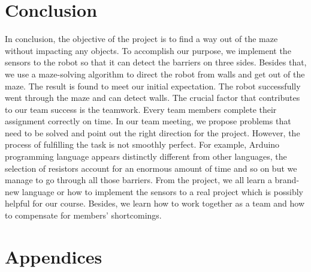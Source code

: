 \documentclass{article}
\begin{document}
\newpage
\section{Conclusion}
In conclusion, the objective of the project is to find a way out of the maze without impacting any objects. To accomplish our purpose, we implement the sensors to the robot so that it can detect the barriers on three sides. Besides that, we use a maze-solving algorithm to direct the robot from walls and get out of the maze. The result is found to meet our initial expectation. The robot successfully went through the maze and can detect walls. The crucial factor that contributes to our team success is the teamwork. Every team members complete their assignment correctly on time. In our team meeting, we propose problems that need to be solved and point out the right direction for the project.   However, the process of fulfilling the task is not smoothly perfect. For example, Arduino programming language appears distinctly different from other languages, the selection of resistors account for an enormous amount of time and so on but we manage to go through all those barriers. From the project, we all learn a brand-new language or how to implement the sensors to a real project which is possibly helpful for our course. Besides, we learn how to work together as a team and how to compensate for members' shortcomings.


\newpage
\section{Appendices}
\end{document}
